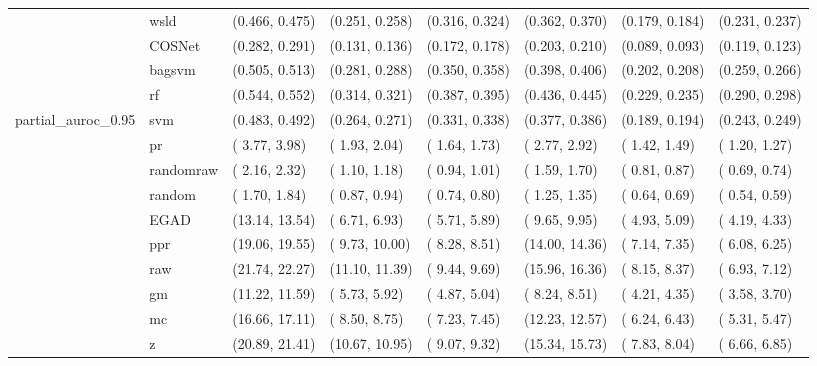 \begin{table}[H]
{\begin{tabular}{llllllll}
 & wsld & (0.466, 0.475) & (0.251, 0.258) & (0.316, 0.324) & (0.362, 0.370) & (0.179, 0.184) & (0.231, 0.237)\\

 & COSNet & (0.282, 0.291) & (0.131, 0.136) & (0.172, 0.178) & (0.203, 0.210) & (0.089, 0.093) & (0.119, 0.123)\\

 & bagsvm & (0.505, 0.513) & (0.281, 0.288) & (0.350, 0.358) & (0.398, 0.406) & (0.202, 0.208) & (0.259, 0.266)\\

 & rf & (0.544, 0.552) & (0.314, 0.321) & (0.387, 0.395) & (0.436, 0.445) & (0.229, 0.235) & (0.290, 0.298)\\

\multirow{-15}{*}{\raggedright\arraybackslash partial\_auroc\_0.95} & svm & (0.483, 0.492) & (0.264, 0.271) & (0.331, 0.338) & (0.377, 0.386) & (0.189, 0.194) & (0.243, 0.249)\\
\cmidrule{1-8}
 & pr & ( 3.77,  3.98) & ( 1.93,  2.04) & ( 1.64,  1.73) & ( 2.77,  2.92) & ( 1.42,  1.49) & ( 1.20,  1.27)\\

 & randomraw & ( 2.16,  2.32) & ( 1.10,  1.18) & ( 0.94,  1.01) & ( 1.59,  1.70) & ( 0.81,  0.87) & ( 0.69,  0.74)\\

 & random & ( 1.70,  1.84) & ( 0.87,  0.94) & ( 0.74,  0.80) & ( 1.25,  1.35) & ( 0.64,  0.69) & ( 0.54,  0.59)\\

 & EGAD & (13.14, 13.54) & ( 6.71,  6.93) & ( 5.71,  5.89) & ( 9.65,  9.95) & ( 4.93,  5.09) & ( 4.19,  4.33)\\

 & ppr & (19.06, 19.55) & ( 9.73, 10.00) & ( 8.28,  8.51) & (14.00, 14.36) & ( 7.14,  7.35) & ( 6.08,  6.25)\\

 & raw & (21.74, 22.27) & (11.10, 11.39) & ( 9.44,  9.69) & (15.96, 16.36) & ( 8.15,  8.37) & ( 6.93,  7.12)\\

 & gm & (11.22, 11.59) & ( 5.73,  5.92) & ( 4.87,  5.04) & ( 8.24,  8.51) & ( 4.21,  4.35) & ( 3.58,  3.70)\\

 & mc & (16.66, 17.11) & ( 8.50,  8.75) & ( 7.23,  7.45) & (12.23, 12.57) & ( 6.24,  6.43) & ( 5.31,  5.47)\\

 & z & (20.89, 21.41) & (10.67, 10.95) & ( 9.07,  9.32) & (15.34, 15.73) & ( 7.83,  8.04) & ( 6.66,  6.85)\\


\end{tabular}}
\end{table}
